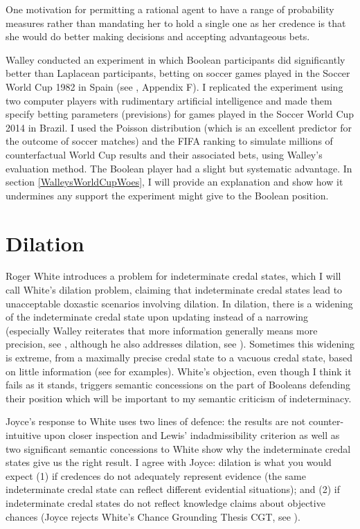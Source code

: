 One motivation for permitting a rational agent to have
a range of probability measures rather than mandating
her to hold a single one as her credence is that she
would do better making decisions and accepting
advantageous bets.

Walley conducted an experiment in which Boolean
participants did significantly better than Laplacean
participants, betting on soccer games played in the
Soccer World Cup 1982 in Spain (see
, Appendix F). I replicated the experiment using two
computer players with rudimentary artificial
intelligence and made them specify betting parameters
(previsions) for games played in the Soccer World Cup
2014 in Brazil. I used the Poisson distribution (which
is an excellent predictor for the outcome of soccer
matches) and the FIFA ranking to simulate millions of
counterfactual World Cup results and their associated
bets, using Walley's evaluation method. The Boolean
player had a slight but systematic advantage. In
section \ref{WalleysWorldCupWoes}, I will provide an
explanation and show how it undermines any support the
experiment might give to the Boolean position.

\section{Dilation}
\label{Dilation}

Roger White introduces a problem for indeterminate
credal states, which I will call White's dilation
problem, claiming that indeterminate credal states lead
to unacceptable doxastic scenarios involving dilation.
In dilation, there is a widening of the indeterminate
credal state upon updating instead of a narrowing
(especially Walley reiterates that more information
generally means more precision, see
, although he also addresses
dilation, see ). Sometimes this
widening is extreme, from a maximally precise credal
state to a vacuous credal state, based on little
information (see  for examples).
White's objection, even though I think it fails as it
stands, triggers semantic concessions on the part of
Booleans defending their position which will be
important to my semantic criticism of indeterminacy.

Joyce's response to White uses two lines of defence:
the results are not counter-intuitive upon closer
inspection and Lewis' indadmissibility criterion as
well as two significant semantic concessions to White
show why the indeterminate credal states give us the
right result. I agree with Joyce: dilation is what you
would expect (1) if credences do not adequately
represent evidence (the same indeterminate credal state
can reflect different evidential situations); and (2)
if indeterminate credal states do not reflect knowledge
claims about objective chances (Joyce rejects White's
Chance Grounding Thesis CGT, see
).


